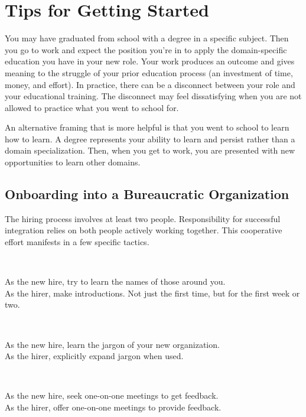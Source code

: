 \section{Tips for Getting Started}

You may have graduated from school with a degree in a specific subject. Then you go to work and expect the position you're in to apply the domain-specific education you have in your new role. Your work produces an outcome and gives meaning to the struggle of your prior education process (an investment of time, money, and effort). In practice, there can be a disconnect between your role and your educational training. The disconnect may feel dissatisfying when you are not allowed to practice what you went to school for.

An alternative framing that is more helpful is that you went to school to learn how to learn. A degree represents your ability to learn and persist rather than a domain specialization. Then, when you get to work, you are presented with new opportunities to learn other domains. 

\subsection*{Onboarding into a Bureaucratic Organization}

The hiring process involves at least two people. Responsibility for successful integration relies on both people actively working together. This cooperative effort manifests in a few specific tactics. 

\ \\
\begin{minipage}{\textwidth}
As the new hire, try to learn the names of those around you.\\
As the hirer, make introductions. Not just the first time, but for the first week or two.
\end{minipage}

\ \\
\begin{minipage}{\textwidth}
As the new hire, learn the jargon of your new organization.\\
As the hirer, explicitly expand jargon when used.
\end{minipage}

\ \\
\begin{minipage}{\textwidth}
As the new hire, seek one-on-one meetings to get feedback.\\
As the hirer, offer one-on-one meetings to provide feedback.
\end{minipage}


